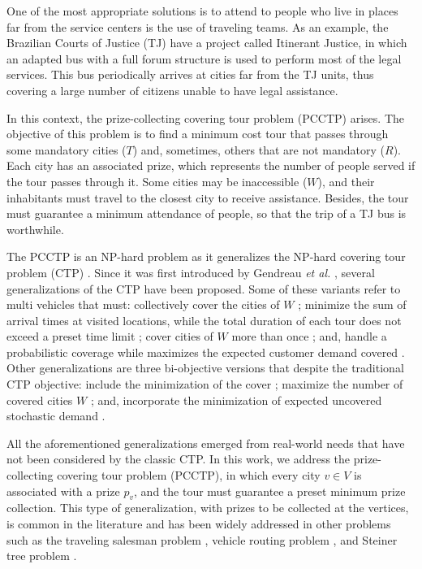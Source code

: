 \documentclass{ro}
\begin{document}
One of the most appropriate	solutions is to attend to people who live in places far from the service centers is the use of traveling teams. As an example, the Brazilian Courts of Justice (TJ) have a project called Itinerant Justice, in which an adapted bus with a full forum structure is used to perform most of the legal services. This bus periodically arrives at cities far from the TJ units, thus covering a large number of citizens unable to have legal assistance. 

In this context, the prize-collecting covering tour problem (PCCTP) arises. The objective of this problem is to find a minimum cost tour that passes through some mandatory cities ($T$) and, sometimes, others that are not mandatory ($R$). Each city has an associated prize, which represents the number of people served if the tour passes through it. Some cities may be inaccessible ($W$), and their inhabitants must travel to the closest city to receive assistance. Besides, the tour must guarantee a minimum attendance of people, so that the trip of a TJ bus is worthwhile.


The PCCTP is an NP-hard problem as it generalizes the  NP-hard covering tour problem (CTP) \cite{gendreau1997covering}. Since it was first introduced by Gendreau \textit{et al.} \cite{gendreau1997covering}, several generalizations of the CTP have been proposed. Some of these variants refer to multi vehicles that must: collectively cover the cities of $W$ \cite{hachicha2000heuristics}; minimize the sum of arrival times at visited locations, while the total duration of each tour does not exceed a preset time limit \cite{flores2017multi}; cover cities of $W$ more than once \cite{pham2017solving}; and,  handle a probabilistic coverage while maximizes the expected customer demand covered \cite{karaouglan2018multi}. Other generalizations are three bi-objective  versions that despite the traditional CTP objective: include the minimization of the cover \cite{jozefowiez2007bi};  maximize the number of covered cities $W$ \cite{ebrahimi2012maximal}; and, incorporate the minimization of expected uncovered stochastic demand \cite{tricoire2012bi}.

All the aforementioned generalizations  emerged from real-world needs that have not been considered by the classic CTP. In this work, we address the prize-collecting covering tour problem (PCCTP), in which every city $v \in V$ is associated with a prize $p_v$, and the tour must guarantee a preset minimum prize collection. This type of generalization, with prizes to be collected at the vertices, is common in the literature and has been widely addressed in other problems such as the traveling salesman problem \cite{berube2009branch}, vehicle routing problem \cite{trachanatzi2020firefly}, and Steiner tree problem \cite{canuto2001local}.
\end{document}
